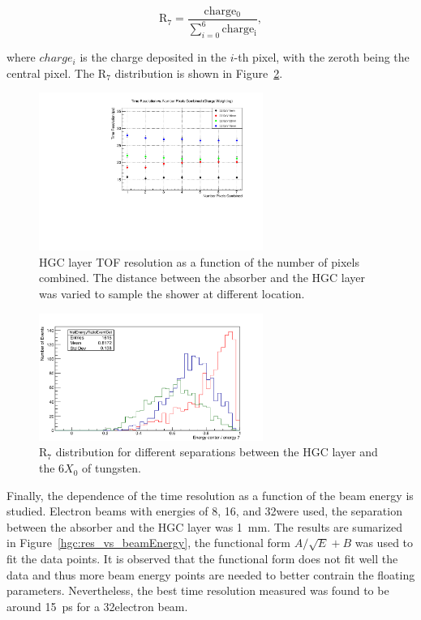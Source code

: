 \begin{equation}
\mathrm{R_{7}} = \frac{\mathrm{charge_{0}}}{\sum\limits_{i=0}^{6} \mathrm{charge_{i}}},
\end{equation}

where $charge_{i}$ is the charge deposited in the $i$-th pixel, with
the zeroth being the central pixel. The $\mathrm{R_{7}}$ distribution
is shown in Figure~\ref{hgc:R7}.

\begin{figure}[h] 
\centering
\includegraphics[width=0.65\textwidth]{HGC/charge_weighting.pdf} 
\caption{HGC layer TOF resolution as a function of the number of
  pixels combined. The distance between the absorber and the HGC layer
was varied to sample the shower at different location.} 
\label{hgc:tof_vs_pixel} 
\end{figure}
\begin{figure}[h] 
\centering
\includegraphics[width=0.65\textwidth]{HGC/center_all_ratio.png} 
\caption{$\mathrm{R_{7}}$ distribution for different separations
  between the HGC layer and the 6$X_{0}$ of tungsten.} 
\label{hgc:R7} 
\end{figure}

Finally, the dependence of the time resolution as a function of the
beam energy is studied. Electron beams with energies of 8, 16, and
32\GeV were used, the separation between the absorber and the HGC
layer was 1~mm. The results are sumarized in
Figure~\ref{hgc:res_vs_beamEnergy}, the functional form $A/\sqrt{E} +
B$ was used to fit the data points. It is observed that the functional
form does not fit well the data and thus more beam energy points are needed
to better contrain the floating parameters. Nevertheless, the best time
resolution measured was found to be around 15~ps for a 32\GeV electron
beam.

